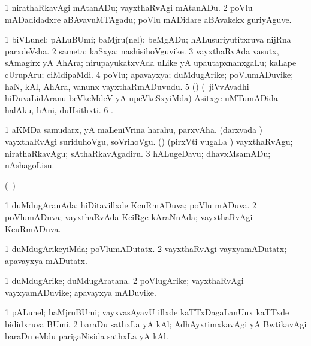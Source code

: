 {\noindent 
\gl{\pagu}
\expl{}
\bmng
\bnum
\num{1}  nirathaRkavAgi mAtanADu; vayxthaRvAgi mAtanADu. 
\num{2}  poVlu mADadidadxre aBAvavuMTAgadu; poVlu mADidare aBAvakekx guriyAguve. 
\enum
\emng
\eentry

\bentry
{} 
\gl{\nA}
\expl{}
\bmng
\bnum
\num{1} biVLunel; pALuBUmi; baMjru(nel); beMgADu; hALusuriyutitxruva nijRna parxdeVsha. 
\num{2} sameta; kaSxya; nashisihoVguvike. 
\num{3} vayxthaRvAda vasutx, sAmagirx yA AhAra; nirupayukatxvAda uLike yA upautapxnanxgaLu; kaLape cUrupAru; ciMdipaMdi. 
\num{4} poVlu; apavayxya; duMdugArike; poVlumADuvike; haN, kAl, AhAra, \mo vanunx vayxthaRmADuvudu. 
\num{5} (\nAyxshA) (\kanmu\ jiVvAvadhi hiDuvaLidAranu beVkeMdeV yA upeVkeSxyiMda) Asitxge uMTumADida halAku, hAni, duHsithxti. 
\num{6} . 
\enum
\emng

\noindent 
\gl{\pagu}
\expl{}
\bmng
\bnum
\num{1}  aKMDa samudarx, yA maLeniVrina harahu, parxvAha. 
  
\banum
{} (darxvada \vi) vayxthaRvAgi suriduhoVgu, soVrihoVgu. 
 (\rUpa) (pirxVti \mo vugaLa \vi) vayxthaRvAgu; nirathaRkavAgu; sAthaRkavAgadiru. 
\eanum
\numie
\num{3}  hALugeDavu; dhavxMsamADu; nAshagoLisu. 
\enum
\emng
\eentry

\bentry
{} 
\gl{\nA}
\expl{}
\bmng
(\kanmu\ \ame)  
\emng
\eentry

\bentry
{} 
\gl{\gu}
\expl{}
\bmng
\bnum
\num{1} duMdugAranAda; hiDitavillxde KcuRmADuva; poVlu mADuva. 
\num{2} poVlumADuva; vayxthaRvAda KciRge kAraNnAda; vayxthaRvAgi KcuRmADuva. 
\enum
\emng
\eentry

\bentry
{} 
\gl{\kirxvi}
\expl{}
\bmng
\bnum
\num{1} duMdugArikeyiMda; poVlumADutatx. 
\num{2} vayxthaRvAgi vayxyamADutatx; apavayxya mADutatx. 
\enum
\emng
\eentry

\bentry
{} 
\gl{\nA}
\expl{}
\bmng
\bnum
\num{1} duMdugArike; duMdugAratana. 
\num{2} poVlugArike; vayxthaRvAgi vayxyamADuvike; apavayxya mADuvike. 
\enum
\emng
\eentry

\bentry
{} 
\gl{\nA}
\expl{}
\bmng
\bnum
\num{1} pALunel; baMjruBUmi; vayxvasAyavU illxde kaTTxDagaLanUnx kaTTxde bididxruva BUmi. 
\num{2} baraDu sathxLa yA kAl; AdhAyxtimxkavAgi yA BwtikavAgi baraDu eMdu parigaNisida sathxLa yA kAl. 
\enum
\emng
\eentry

}
